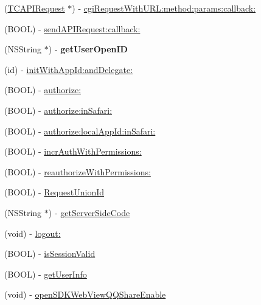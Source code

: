 \begin{DoxyCompactItemize}
\item 
(\mbox{\hyperlink{interface_t_c_a_p_i_request}{T\+C\+A\+P\+I\+Request}} $\ast$) -\/ \mbox{\hyperlink{interface_tencent_o_auth_a3b1f8572362e0577eaf748dd183dab98}{cgi\+Request\+With\+U\+R\+L\+:method\+:params\+:callback\+:}}
\item 
(B\+O\+OL) -\/ \mbox{\hyperlink{interface_tencent_o_auth_a0d2819557e5b7be2de54f21419718763}{send\+A\+P\+I\+Request\+:callback\+:}}
\item 
\mbox{\label{interface_tencent_o_auth_a86568108ba898f81cf03462b07fead17}} 
(N\+S\+String $\ast$) -\/ {\bfseries get\+User\+Open\+ID}
\item 
(id) -\/ \mbox{\hyperlink{interface_tencent_o_auth_ab9fec0e89d909e69750911ce59d0d7f4}{init\+With\+App\+Id\+:and\+Delegate\+:}}
\item 
(B\+O\+OL) -\/ \mbox{\hyperlink{interface_tencent_o_auth_a996be450c28db1855873e0853b9fcf27}{authorize\+:}}
\item 
(B\+O\+OL) -\/ \mbox{\hyperlink{interface_tencent_o_auth_a6e5dc1555fb4a0fe063dfff83b12c9e5}{authorize\+:in\+Safari\+:}}
\item 
(B\+O\+OL) -\/ \mbox{\hyperlink{interface_tencent_o_auth_aadc37e11bb06fe26f11eb0b8b0165229}{authorize\+:local\+App\+Id\+:in\+Safari\+:}}
\item 
(B\+O\+OL) -\/ \mbox{\hyperlink{interface_tencent_o_auth_abe9ca35d1c305cc9219cb6738606df2d}{incr\+Auth\+With\+Permissions\+:}}
\item 
(B\+O\+OL) -\/ \mbox{\hyperlink{interface_tencent_o_auth_a0cae2d11a0ac52e1877a05c05100669d}{reauthorize\+With\+Permissions\+:}}
\item 
(B\+O\+OL) -\/ \mbox{\hyperlink{interface_tencent_o_auth_a8161f0a4e6a3398ecae478e515915e3a}{Request\+Union\+Id}}
\item 
(N\+S\+String $\ast$) -\/ \mbox{\hyperlink{interface_tencent_o_auth_a6cf5e8f4d122592e70fb82076a0cd8d3}{get\+Server\+Side\+Code}}
\item 
(void) -\/ \mbox{\hyperlink{interface_tencent_o_auth_a6f92b7e58f66ab4657107139c2d2f05b}{logout\+:}}
\item 
(B\+O\+OL) -\/ \mbox{\hyperlink{interface_tencent_o_auth_ae8ab093ff77ef33286e1809736d2609b}{is\+Session\+Valid}}
\item 
(B\+O\+OL) -\/ \mbox{\hyperlink{interface_tencent_o_auth_a442df11581fef0f224ad8c1abfb52c0a}{get\+User\+Info}}
\item 
(void) -\/ \mbox{\hyperlink{interface_tencent_o_auth_aafe5fa40dc8b6ff0f7bb3d72bbecd663}{open\+S\+D\+K\+Web\+View\+Q\+Q\+Share\+Enable}}

\end{DoxyCompactItemize}
